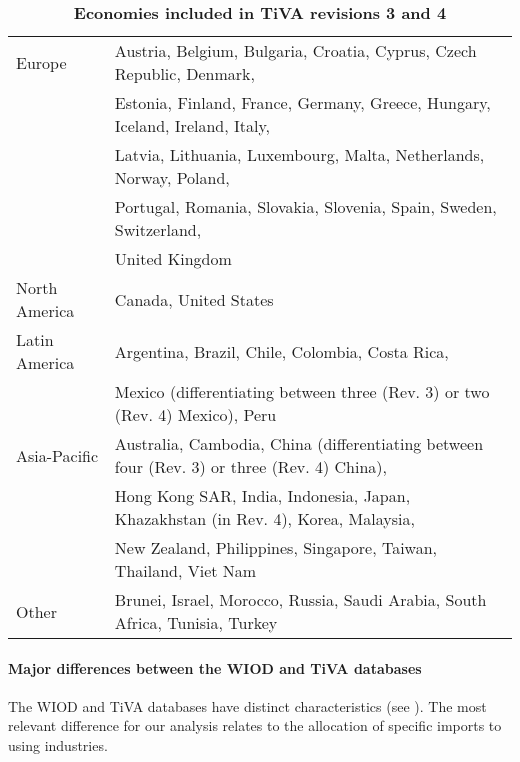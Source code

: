 \documentclass[11pt,a4paper]{article}
\begin{document}
\begin{table}[!h]
\begin{threeparttable}
\centering
\centering
\caption{\small{\textbf{Economies included in TiVA revisions 3 and 4}}}
\small
\begin{tabular}{ll}
\hline\hline
Europe & Austria, Belgium, Bulgaria, Croatia, Cyprus, Czech Republic, Denmark,\\
& Estonia, Finland, France, Germany, Greece, Hungary, Iceland, Ireland, Italy,\\
& Latvia, Lithuania, Luxembourg, Malta, Netherlands, Norway, Poland,\\
&Portugal, Romania, Slovakia, Slovenia, Spain, Sweden, Switzerland,\\
& United Kingdom\\
North  America& Canada, United States\\
Latin America & Argentina, Brazil, Chile, Colombia, Costa Rica, \\ 
&Mexico (differentiating between three (Rev. 3) or two (Rev. 4) Mexico), Peru\\
Asia-Pacific & Australia, Cambodia, China (differentiating between four (Rev. 3) or three (Rev. 4) China), \\
& Hong Kong SAR, India, Indonesia, Japan, Khazakhstan (in Rev. 4), Korea, Malaysia, \\
& New Zealand, Philippines, Singapore, Taiwan, Thailand, Viet Nam\\
Other & Brunei, Israel, Morocco, Russia, Saudi Arabia, South Africa, Tunisia, Turkey\\
\hline\hline
\end{tabular} 
\label{tab:tiva}
\end{threeparttable}
\end{table} 


\paragraph{Major differences between the WIOD and TiVA databases}
The WIOD and TiVA databases have distinct characteristics (see \cite{Timmer2015}). 
The most relevant difference for our analysis relates to the allocation of specific imports to using industries.
\end{document}
